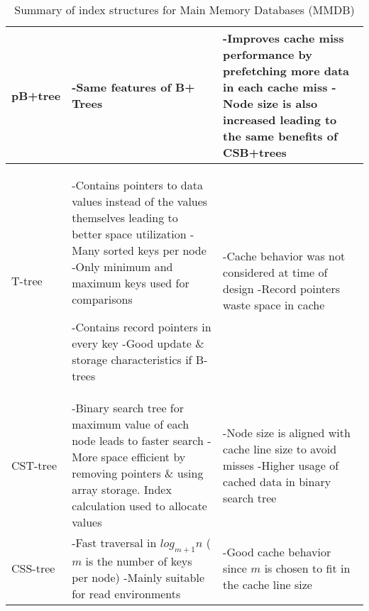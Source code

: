 \documentclass[12pt,a4paper]{article}
\begin{document}
\begin{table}[t!]
{\begin{tabular}{p{2.2cm}||p{6cm}|p{6cm}}
pB+tree & 
-Same features of B+ Trees
             &
-Improves cache miss performance by prefetching more data in each cache miss \linebreak \linebreak
-Node size is also increased leading to the same benefits of CSB+trees\\
\hline
T-tree &  
-Contains pointers to data values instead of the values themselves leading to better space utilization \linebreak \linebreak
-Many sorted keys per node \linebreak \linebreak
-Only minimum and maximum keys used for comparisons \linebreak \linebreak
\raggedright -Contains record pointers in every key \linebreak \linebreak
-Good update \& storage characteristics if B-trees
             &
-Cache behavior was not considered at time of design \linebreak \linebreak
-Record pointers waste space in cache\\
\hline
CST-tree & 
-Binary search tree for maximum value of each node leads to faster search \linebreak \linebreak
-More space efficient by removing pointers \& using array storage. Index calculation used to allocate values &
-Node size is aligned with cache line size to avoid misses \linebreak \linebreak
-Higher usage of cached data in binary search tree\\
\hline
CSS-tree & 
-Fast traversal in $log_{m+1}n$ ($m$ is the number of keys per node) \linebreak \linebreak
-Mainly suitable for read environments &
-Good cache behavior since $m$ is chosen to fit in the cache line size\\

\end{tabular}
}
\caption{Summary of index structures for Main Memory Databases (MMDB)}
\label{tab:mmdbindexsumm}
\end{table}
\end{document}
